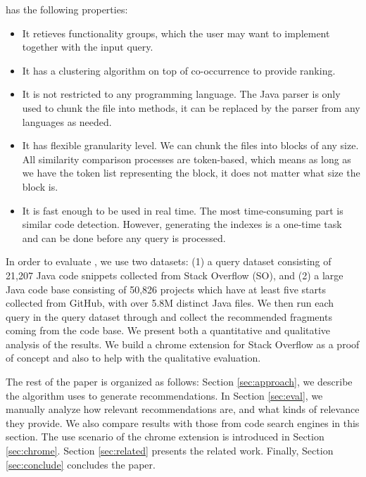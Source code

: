 {\tool} has the following properties:
\begin{itemize}
	\item It retieves functionality groups, which the user may want to implement together with the input query.
	\item It has a clustering algorithm on top of co-occurrence to provide ranking.
	\item It is not restricted to any programming language. The Java parser is only used to chunk the file into methods, it can be replaced by the parser from any languages as needed.
	\item It has flexible granularity level. We can chunk the files into blocks of any size. All similarity comparison processes are token-based, which means as long as we have the token list representing the block, it does not matter what size the block is.
	\item It is fast enough to be used in real time. The most
          time-consuming part is similar code detection. However,
          generating the indexes is a one-time task and can be done
          before any query is processed.	
\end{itemize}

In order to evaluate {\tool}, we use two datasets: (1) a query dataset
consisting of 21,207 Java code snippets collected from Stack Overflow
(SO), and (2) a large Java code base consisting of 50,826 projects which 
have at least five starts collected from GitHub, with over 5.8M distinct 
Java files. We then run each query in the query dataset through {\tool} 
and collect the recommended fragments coming from the code base. 
We present both a quantitative and qualitative analysis of the results.
We build a chrome extension for Stack Overflow as a proof of concept and also to help with the qualitative evaluation.

The rest of the paper is organized as follows: Section
\ref{sec:approach}, we describe the algorithm {\tool} uses to generate
recommendations. In Section \ref{sec:eval}, we manually analyze how
relevant {\tool} recommendations are, and what kinds of relevance they
provide. We also compare {\tool} results with those from code search
engines in this section. The use scenario of the chrome extension is introduced in Section \ref{sec:chrome}. Section \ref{sec:related} presents the
related work. Finally, Section \ref{sec:conclude} concludes the paper.
